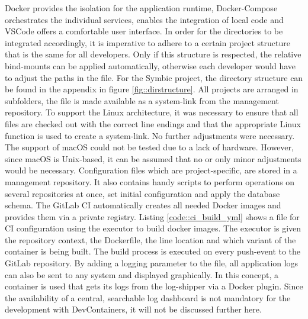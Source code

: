         Docker provides the isolation for the application runtime, Docker-Compose orchestrates the individual services, enables the integration of local code and \ac{VSCode} offers a comfortable user interface. In order for the directories to be integrated accordingly, it is imperative to adhere to a certain project structure that is the same for all developers. Only if this structure is respected, the relative bind-mounts can be applied automatically, otherwise each developer would have to adjust the paths in the  file. For the Symbic project, the directory structure can be found in the appendix in figure \ref{fig::dirstructure}. All projects are arranged in subfolders, the  file is made available as a system-link from the management repository. To support the Linux architecture, it was necessary to ensure that all files are checked out with the correct line endings and that the appropriate Linux function is used to create a system-link. No further adjustments were necessary. The support of macOS could not be tested due to a lack of hardware. However, since macOS is Unix-based, it can be assumed that no or only minor adjustments would be necessary.\newline
        Configuration files which are project-specific, are stored in a management repository. It also contains handy scripts to perform operations on several repositories at once, set initial configuration and apply the database schema. The GitLab \ac{CI} automatically creates all needed Docker images and provides them via a private registry. Listing \ref{code::ci_build_yml} shows a  file for \ac{CI} configuration using the  executor to build docker images. The executor is given the repository context, the Dockerfile, the line location and which variant of the container is being built. The build process is executed on every push-event to the GitLab repository.\newline
        By adding a logging parameter to the  file, all application logs can also be sent to any system and displayed graphically. In this concept, a  container is used that gets its logs from the  log-shipper via a Docker plugin. Since the availability of a central, searchable log dashboard is not mandatory for the development with DevContainers, it will not be discussed further here. \newline
        

